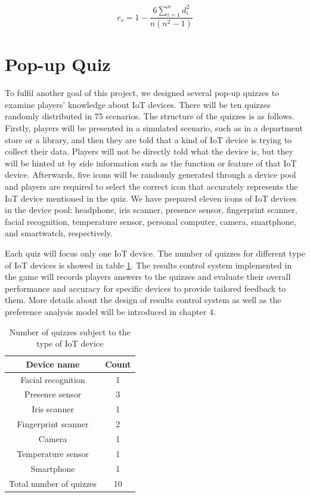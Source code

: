 \documentclass[msc,deptreport,ai]{infthesis}      %
\begin{document}
\begin{equation}
\label{equation:SRCC}
    r_s = 1- \frac{6\sum_{i=1}^{n}d_i^2}{n(n^2-1)}
\end{equation}

\section{Pop-up Quiz}

To fulfil another goal of this project,  we designed several pop-up quizzes to examine players' knowledge about IoT devices. There will be ten quizzes randomly distributed in 75 scenarios. The structure of the quizzes is as follows. Firstly, players will be presented in a simulated scenario, such as in a department store or a library, and then they are told that a kind of IoT device is trying to collect their data. Players will not be directly told what the device is, but they will be hinted at by side information such as the function or feature of that IoT device. Afterwards, five icons will be randomly generated through a device pool and players are required to select the correct icon that accurately represents the IoT device mentioned in the quiz. We have prepared eleven icons of IoT devices in the device pool: headphone, iris scanner, presence sensor, fingerprint scanner, facial recognition, temperature sensor, personal computer, camera, smartphone, and smartwatch, respectively.

Each quiz will focus only one IoT device. The number of quizzes for different type of IoT devices is showed in table \ref{tab:quiz}. The results control system implemented in the game will records players answers to the quizzes and evaluate their overall performance and accuracy for specific devices to provide tailored feedback to them. More details about the design of results control system as well as the preference analysis model will be introduced in chapter 4.

\begin{table}[htbp]
    \begin{center}
    \begin{tabular}{ |c| c|}
        \hline
        \textbf{Device name} & \textbf{Count}\\
        \hline
        Facial recognition& 1 \\
        \hline
        Presence sensor& 3\\
        \hline
        Iris scanner & 1\\
        \hline
        Fingerprint scanner & 2\\
        \hline
        Camera & 1\\
        \hline
        Temperature sensor & 1\\
        \hline
        Smartphone & 1\\
        \hline
        Total number of quizzes & 10\\
        \hline
        \end{tabular} 
    \end{center}
    \caption{Number of quizzes subject to the type of IoT device}
    \label{tab:quiz}
\end{table}
\end{document}

